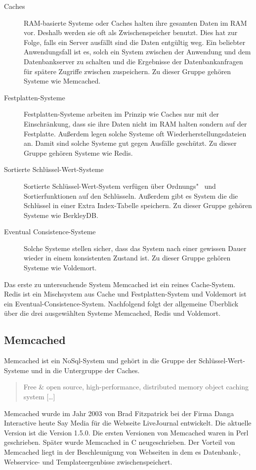 \begin{description}
    \item[Caches] \gls{RAM}-basierte Systeme oder Caches halten ihre gesamten
        Daten im \gls{RAM} vor. Deshalb werden sie oft als Zwischenspeicher
        benutzt. Dies hat zur Folge, falls ein Server ausfällt sind die Daten
        entgültig weg. Ein beliebter Anwendungsfall ist es, solch ein System
        zwischen der Anwendung und dem Datenbankserver zu schalten und die
        Ergebnisse der Datenbankanfragen für spätere Zugriffe zwischen
        zuspeichern. Zu dieser Gruppe gehören Systeme wie Memcached.
    \item[Festplatten-Systeme] Festplatten-Systeme arbeiten im Prinzip wie Caches
        nur mit der Einschränkung, dass sie ihre Daten nicht im \gls{RAM} halten
        sondern auf der Festplatte. Außerdem legen solche Systeme oft
        Wiederherstellungsdateien an. Damit sind solche Systeme gut gegen
        Ausfälle geschützt. Zu dieser Gruppe gehören Systeme wie Redis.
    \item[Sortierte Schlüssel-Wert-Systeme] Sortierte Schlüssel-Wert-System
        verfügen über Ordnungs"~ und Sortierfunktionen auf den Schlüsseln.
        Außerdem gibt es System die die Schlüssel in einer Extra Index-Tabelle
        speichern. Zu dieser Gruppe gehören Systeme wie BerkleyDB.
    \item[Eventual Consistence-Systeme] Solche Systeme stellen sicher, dass das
        System nach einer gewissen Dauer wieder in einem konsistenten Zustand
        ist. Zu dieser Gruppe gehören Systeme wie Voldemort.
\end{description}

Das erste zu untersuchende System Memcached ist ein reines Cache-System.
Redis ist ein Mischsystem aus Cache und Festplatten-System und Voldemort ist
ein Eventual-Consistence-System. Nachfolgend folgt der allgemeine Überblick über
die drei ausgewählten Systeme Memcached, Redis und Voldemort.

\subsection{Memcached}
Memcached ist ein NoSql-System und gehört in die Gruppe der
Schlüssel-Wert-Systeme und in die Untergruppe der Caches.

\foreignblockquote{english}[\cite{Memcached2017}]{Free \& open source,
high-performance, distributed memory object caching system [\ldots]}

Memcached wurde im Jahr 2003 von Brad Fitzpatrick bei der Firma Danga
Interactive heute Say Media für die Webseite LiveJournal entwickelt. Die
aktuelle Version ist die Version 1.5.0. Die ersten Versionen von Memcached
waren in Perl geschrieben. Später wurde Memcached in C neugeschrieben. Der
Vorteil von Memcached liegt in der Beschleunigung von Webseiten in dem es
Datenbank-, Webservice- und Templateergenbisse zwischenspeichert.

